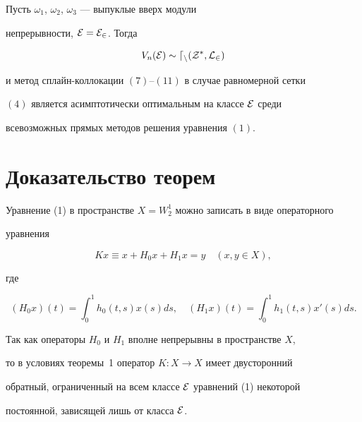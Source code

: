  


 


\begin{thm} 


Пусть $\omega_1$, $\omega_2$, $\omega_3$ --- выпуклые вверх модули 


непрерывности, $\cal E=\cal E_2$. Тогда 


$$ 


V_n(\cal E)\sim d_n(Z^*,L_2) 


$$ 


и метод сплайн-коллокации $(7)$--$(11)$ в случае равномерной сетки 


$(4)$ является асимптотически оптимальным на классе $\cal E$ среди 


всевозможных прямых методов решения уравнения $(1)$. 


\end{thm} 


 


 


\section{Доказательство теорем} 


 


Уравнение (1) в пространстве $X=W^1_2$ можно записать в виде операторного 


уравнения 


\begin{equation} 


Kx\equiv x+H_0x+H_1x=y\quad (x,y\in X),\tag{$1'$} 


\end{equation} 


где 


$$ 


(H_0x)(t)=\int^1_0 h_0(t,s)x(s)ds,\quad 


(H_1x)(t)=\int^1_0 h_1(t,s)x'(s)ds. 


$$ 


Так как операторы $H_0$ и $H_1$ вполне непрерывны в пространстве $X$,


то в условиях теоремы~1 оператор $K:X\to X$ имеет двусторонний 


обратный, ограниченный на всем классе $\cal E$ уравнений (1) некоторой 


постоянной, зависящей лишь от класса $\cal E$. 



